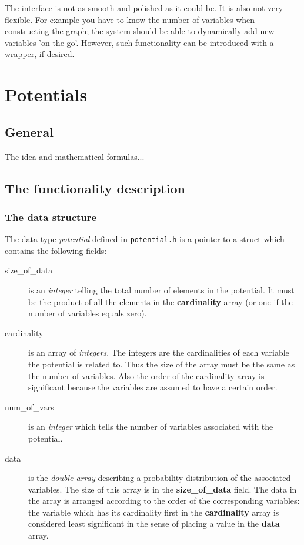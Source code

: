 \documentclass[12pt,a4paper]{report}
\newcommand{\cdatatype}[1]{{\it #1}}
\newcommand{\cfilename}[1]{\texttt{#1}}
\newcommand{\cstructfield}[1]{\textbf{#1}}
\begin{document}
The interface is not as smooth and polished as it could be. It is also
not very flexible. For example you have to know the number of
variables when constructing the graph; the system should be able to
dynamically add new variables 'on the go'. However, such functionality
can be introduced with a wrapper, if desired.


\newpage
\section{Potentials}
\subsection{General}

The idea and mathematical formulas...


\subsection{The functionality description}
\subsubsection{The data structure}
The data type \cdatatype{potential} defined in \cfilename{potential.h} 
is a pointer to a struct which contains the following fields:
\begin{description}
\item[size\_of\_data] is an \cdatatype{integer} telling the total
number of elements in the potential. It must be the product of all the
elements in the \cstructfield{cardinality} array (or one if the number
of variables equals zero).
\item[cardinality] is an array of \cdatatype{integers}. The integers
are the cardinalities of each variable the potential is related
to. Thus the size of the array must be the same as the number of
variables. Also the order of the cardinality array is significant
because the variables are assumed to have a certain order.
\item[num\_of\_vars] is an \cdatatype{integer} which tells the number
of variables associated with the potential.
\item[data] is the \cdatatype{double array} describing a probability
distribution of the associated variables. The size of this array is in
the \cstructfield{size\_of\_data} field. The data in the array is
arranged according to the order of the corresponding variables: the
variable which has its cardinality first in the
\cstructfield{cardinality} array is considered least significant in
the sense of placing a value in the \cstructfield{data} array.
\end{description}
\end{document}
